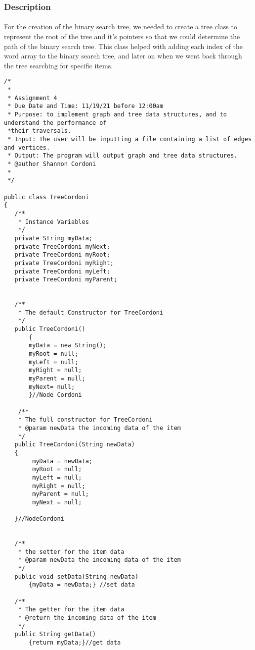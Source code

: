 \documentclass[letterpaper, 10pt,DIV=13]{scrartcl}
\numberwithin{equation}{section} %
\numberwithin{figure}{section} %
\numberwithin{table}{section} %
\begin{document}
\subsubsection{Description}
\paragraph{} For the creation of the binary search tree, we needed to create a tree class to represent the root of the tree and it's pointers so that we could determine the path of the binary search tree. This class helped with adding each index of the word array to the binary search tree, and later on when we went back through the tree searching for specific items.

\lstset{numbers=left, numberstyle=\tiny, stepnumber=1, numbersep=5pt, basicstyle=\footnotesize\ttfamily}
\begin{lstlisting}[frame=single, ] 
/*
 * 
 * Assignment 4
 * Due Date and Time: 11/19/21 before 12:00am 
 * Purpose: to implement graph and tree data structures, and to understand the performance of 
 *their traversals.
 * Input: The user will be inputting a file containing a list of edges and vertices. 
 * Output: The program will output graph and tree data structures. 
 * @author Shannon Cordoni 
 * 
 */

public class TreeCordoni
{
   /**
    * Instance Variables
    */
   private String myData;
   private TreeCordoni myNext;
   private TreeCordoni myRoot;
   private TreeCordoni myRight;
   private TreeCordoni myLeft;
   private TreeCordoni myParent;

   
   /**
    * The default Constructor for TreeCordoni
    */
   public TreeCordoni()
       {
       myData = new String();
       myRoot = null;
       myLeft = null;
       myRight = null;
       myParent = null;
       myNext= null;
       }//Node Cordoni
   
    /**
    * The full constructor for TreeCordoni
    * @param newData the incoming data of the item
    */
   public TreeCordoni(String newData)
   {
        myData = newData;
        myRoot = null;
        myLeft = null;
        myRight = null;
        myParent = null;
        myNext = null;
        
   }//NodeCordoni

   
   /**
    * the setter for the item data
    * @param newData the incoming data of the item
    */
   public void setData(String newData)
       {myData = newData;} //set data
   
   /**
    * The getter for the item data
    * @return the incoming data of the item
    */
   public String getData()
       {return myData;}//get data
   

\end{lstlisting}
\end{document}
